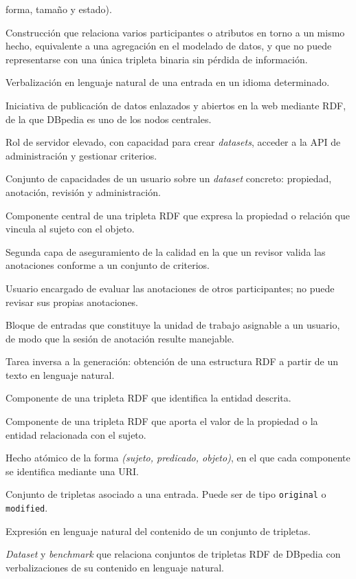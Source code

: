 \begin{description}
	      forma, tamaño y estado).
	\item[Evento n-ario] Construcción que relaciona varios participantes o atributos en
	      torno a un mismo hecho, equivalente a una agregación en el modelado de datos, y
	      que no puede representarse con una única tripleta binaria sin pérdida de
	      información.
	\item[Lexicalización (\textit{lex})] Verbalización en lenguaje natural de una entrada
	      en un idioma determinado.
	\item[\textit{Linked Open Data}] Iniciativa de publicación de datos enlazados y
	      abiertos en la web mediante RDF, de la que DBpedia es uno de los nodos
	      centrales.
	\item[Moderador] Rol de servidor elevado, con capacidad para crear \textit{datasets},
	      acceder a la API de administración y gestionar criterios.
	\item[Permiso (\textit{permit})] Conjunto de capacidades de un usuario sobre un
	      \textit{dataset} concreto: propiedad, anotación, revisión y administración.
	\item[Predicado] Componente central de una tripleta RDF que expresa la propiedad o
	      relación que vincula al sujeto con el objeto.
	\item[Revisión] Segunda capa de aseguramiento de la calidad en la que un revisor
	      valida las anotaciones conforme a un conjunto de criterios.
	\item[Revisor] Usuario encargado de evaluar las anotaciones de otros participantes;
	      no puede revisar sus propias anotaciones.
	\item[Sección] Bloque de entradas que constituye la unidad de trabajo asignable a un
	      usuario, de modo que la sesión de anotación resulte manejable.
	\item[\textit{Semantic parsing}] Tarea inversa a la generación: obtención de una
	      estructura RDF a partir de un texto en lenguaje natural.
	\item[Sujeto] Componente de una tripleta RDF que identifica la entidad descrita.
	\item[Objeto] Componente de una tripleta RDF que aporta el valor de la propiedad o la
	      entidad relacionada con el sujeto.
	\item[Tripleta (RDF)] Hecho atómico de la forma \emph{(sujeto, predicado, objeto)},
	      en el que cada componente se identifica mediante una URI.
	\item[\textit{Tripleset}] Conjunto de tripletas asociado a una entrada. Puede ser de
	      tipo \texttt{original} o \texttt{modified}.
	\item[Verbalización] Expresión en lenguaje natural del contenido de un conjunto de
	      tripletas.
	\item[WebNLG] \textit{Dataset} y \textit{benchmark} que relaciona conjuntos de
	      tripletas RDF de DBpedia con verbalizaciones de su contenido en lenguaje
	      natural.
\end{description}

